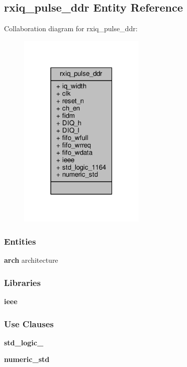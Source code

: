 \subsection{rxiq\+\_\+pulse\+\_\+ddr Entity Reference}
\label{classrxiq__pulse__ddr}


Collaboration diagram for rxiq\+\_\+pulse\+\_\+ddr\+:\nopagebreak
\begin{figure}[H]
\begin{center}
\leavevmode
\includegraphics[width=171pt]{d2/d1a/classrxiq__pulse__ddr__coll__graph}
\end{center}
\end{figure}
\subsubsection*{Entities}
\begin{DoxyCompactItemize}
\item 
{\bf arch} architecture
\end{DoxyCompactItemize}
\subsubsection*{Libraries}
 \begin{DoxyCompactItemize}
\item 
{\bf ieee} 
\end{DoxyCompactItemize}
\subsubsection*{Use Clauses}
 \begin{DoxyCompactItemize}
\item 
{\bf std\+\_\+logic\+\_}   
\item 
{\bf numeric\+\_\+std}   
\end{DoxyCompactItemize}

